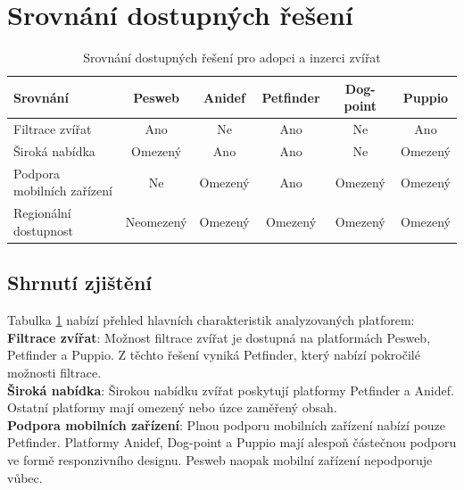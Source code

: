 \documentclass[czech, bp, kiv, he, iso690numb, pdf]{fasthesis}
\begin{document}
    \section{Srovnání dostupných řešení}

    \begin{table}[h!]
        \centering
        \begin{tabular}{|l|c|c|c|c|c|}
            \hline
            \textbf{Srovnání} & \textbf{Pesweb} & \textbf{Anidef} & \textbf{Petfinder} & \textbf{Dog-point} & \textbf{Puppio} \\ \hline
            Filtrace zvířat & Ano & Ne & Ano & Ne & Ano \\ \hline
            Široká nabídka & Omezený & Ano & Ano & Ne & Omezený \\ \hline
            Podpora mobilních zařízení & Ne & Omezený & Ano & Omezený & Omezený \\ \hline
            Regionální dostupnost & Neomezený & Omezený & Omezený & Omezený & Omezený \\ \hline
        \end{tabular}
        \caption{Srovnání dostupných řešení pro adopci a inzerci zvířat}
        \label{tab:srovnani-reseni}
    \end{table}

    \subsection{Shrnutí zjištění}

    Tabulka \ref{tab:srovnani-reseni} nabízí přehled hlavních charakteristik analyzovaných platforem:\\

    \noindent \textbf{Filtrace zvířat}: Možnost filtrace zvířat je dostupná na platformách Pesweb, Petfinder a Puppio. Z těchto řešení vyniká Petfinder, který nabízí pokročilé možnosti filtrace.\\

    \noindent \textbf{Široká nabídka}: Širokou nabídku zvířat poskytují platformy Petfinder a Anidef. Ostatní platformy mají omezený nebo úzce zaměřený obsah.\\

    \noindent \textbf{Podpora mobilních zařízení}: Plnou podporu mobilních zařízení nabízí pouze Petfinder. Platformy Anidef, Dog-point a Puppio mají alespoň částečnou podporu ve formě responzivního designu. Pesweb naopak mobilní zařízení nepodporuje vůbec.\\
\end{document}
